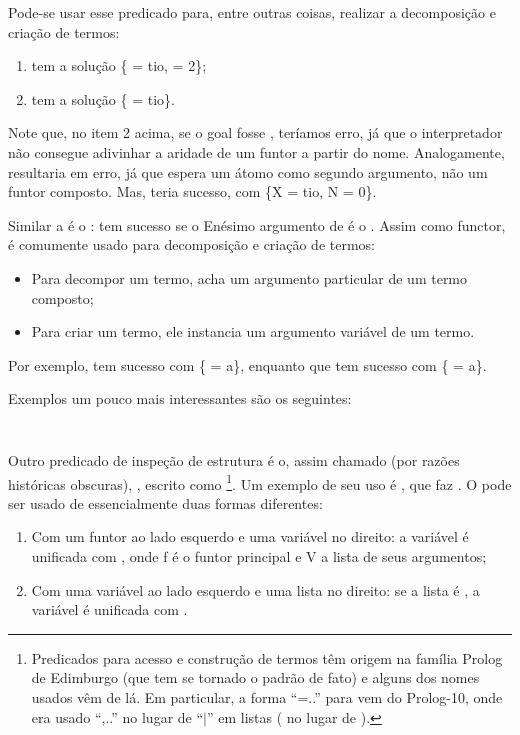 \documentclass{article}
\begin{document}
Pode-se usar esse predicado para, entre outras coisas, realizar a decomposição e criação de termos:
\begin{enumerate}
  \item{} tem a solução \{ = tio,  = 2\};
  \item{} tem a solução \{ = tio\}.
\end{enumerate}

Note que, no item 2 acima, se o goal fosse , teríamos erro, já que o interpretador não consegue adivinhar a aridade de um funtor a partir do nome. Analogamente,
 resultaria em erro, já que  espera um átomo como segundo argumento, não um funtor composto. Mas,  teria sucesso, com \{X = tio, N = 0\}.

Similar a  é o :  tem
sucesso se o Enésimo argumento de  é o . Assim como functor,  é comumente usado para decomposição e criação de termos:
\begin{itemize}
  \item Para decompor um termo,  acha um argumento particular de um termo composto;
  \item Para criar um termo, ele instancia um argumento variável de um termo.
\end{itemize}

Por exemplo,  tem sucesso com \{ = a\}, enquanto que  tem sucesso com \{ = a\}.

Exemplos um pouco mais interessantes são os seguintes:

\inputminted{prolog}{../Exemplos/Cap6/prog1_subtermo.pl}

\inputminted{prolog}{../Exemplos/Cap6/prog2_substitui.pl}

Outro predicado de inspeção de estrutura é o, assim chamado (por razões históricas obscuras),
, escrito como \footnote{Predicados para acesso e construção de termos
  têm origem na família Prolog de Edimburgo (que tem se tornado o padrão de fato) e alguns dos nomes
  usados vêm de lá. Em particular, a forma “=..” para  vem do Prolog-10, onde era
  usado “,..” no lugar de “$|$” em listas (\codigo{[a, b,.. Xs]} no lugar de \codigo{[a, b|Xs]}).}.
Um exemplo de seu uso é , que faz .
O  pode ser usado de essencialmente duas formas diferentes:
\begin{enumerate}
  \item Com um funtor ao lado esquerdo e uma variável no direito: a variável é unificada com \codigo{[f|v]}, onde f é o funtor principal e V a lista de seus argumentos;
  \item Com uma variável ao lado esquerdo e uma lista no direito: se a lista é \codigo{[a, $b_1$, ..., $b_n$]}, a variável é unificada com .
\end{enumerate}
\end{document}
